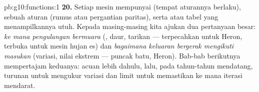 \begin{solution}{pb:g10:functions:1}
\textbf{20.} Setiap mesin mempunyai  (tempat aturannya
berlaku), sebuah aturan (rumus atau pergantian paritas), serta
 atau tabel yang menampilkannya utuh. Kepada masing-masing kita
ajukan dua pertanyaan besar: \emph{ke mana pengulangan bermuara}
(, daur, tarikan --- terpecahkan untuk Heron, terbuka untuk
mesin hujan es) dan \emph{bagaimana keluaran bergerak mengikuti masukan}
(variasi, nilai ekstrem --- puncak batu,  Heron).
Bab-bab berikutnya mempertajam keduanya:  acuan lebih dahulu,
lalu, pada tahun-tahun mendatang, turunan untuk mengukur variasi dan
limit untuk memastikan ke mana iterasi mendarat.

\end{solution}
